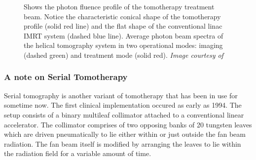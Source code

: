 \documentclass[10pt,journal,compsoc]{IEEEtran} %
\begin{document}
  \begin{figure}[htbp]
    \centering
    \caption{\protect{} Shows the photon fluence profile of the 
    tomotherapy treatment beam. Notice the characteristic conical shape of the 
    tomotherapy profile (solid red line) and the flat shape of the conventional 
    linac IMRT system (dashed blue line). 
    \protect{} Average photon beam spectra of the helical 
    tomography system in two operational modes: imaging (dashed green) and 
    treatment mode (solid red). \textit{Image courtesy of \cite{Jeraj2004}}}
    \label{fig5}
  \end{figure}
  \subsubsection{A note on Serial Tomotherapy}
  Serial tomography is another variant of tomotherapy that has been in use for 
  sometime now. The first clinical implementation occured as early as 1994. The 
  setup consists of a binary multileaf collimator attached to a conventional 
  linear accelerator. The collimator comprises of two opposing banks of 20 
  tungsten leaves which are driven pneumatically to lie either within or just 
  outside the fan beam radiation. The fan beam itself is modified by arranging 
  the leaves to lie within the radiation field for a variable amount of time.
  
\end{document}
